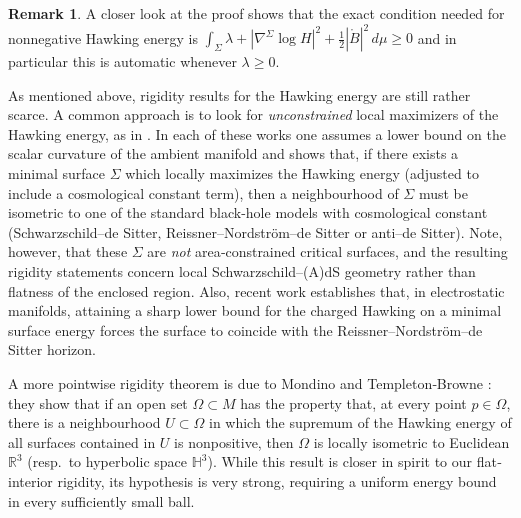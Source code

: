 \documentclass[12pt,a4paper]{amsart}
\theoremstyle{plain}
\theoremstyle{definition}
\newtheorem{remark}[theorem]{Remark}
\newcommand{\R}{\mathbb{R}}
\begin{document}
\begin{remark}
   A closer look at the proof shows that the exact condition needed for nonnegative Hawking energy is $ \int_{\Sigma}  \lambda+|\nabla^{\Sigma}  \log H|^2  +\frac{1}{2} |\mathring{B}|^2  \, d\mu \geq 0 $ and in particular this is automatic whenever $\lambda \geq 0$.
\end{remark}
As mentioned above, rigidity results for the Hawking energy are still rather scarce.  A common approach is to look for {\em unconstrained} local maximizers  of the Hawking energy, as in   \cite{baltazar2023local,barros2017hawking, lee2025modified, maximo2012hawking, sousa2023charged}.  In each of these works one assumes a lower bound on the scalar curvature of the ambient manifold and shows that, if there exists a minimal surface \(\Sigma\) which locally maximizes the Hawking energy (adjusted to include a cosmological constant term), then a neighbourhood of \(\Sigma\) must be isometric to one of the standard black-hole models with cosmological constant (Schwarzschild–de Sitter, Reissner–Nordström–de Sitter or anti–de Sitter).  Note, however, that these \(\Sigma\) are {\em not} area‐constrained critical surfaces, and the resulting rigidity statements concern local Schwarzschild–(A)dS geometry rather than flatness of the enclosed region.  Also, recent work \cite{leandro2025sharp} establishes that, in electrostatic manifolds, attaining a sharp lower bound for the charged Hawking on a minimal surface energy forces the surface to coincide with the Reissner–Nordström–de Sitter horizon.

A more pointwise rigidity theorem is due to Mondino and Templeton‐Browne \cite{mondino2022some}: they show that if an open set \(\Omega\subset M\) has the property that, at every point \(p\in\Omega\), there is a neighbourhood \(U\subset\Omega\) in which the supremum of the Hawking energy of all surfaces contained in \(U\) is nonpositive, then \(\Omega\) is locally isometric to Euclidean \( \R^3\) (resp.\ to hyperbolic space \( \mathbb{H}^3\)).  While this result is closer in spirit to our flat‐interior rigidity, its hypothesis is very strong, requiring a uniform energy bound in every sufficiently small ball. 
\end{document}
